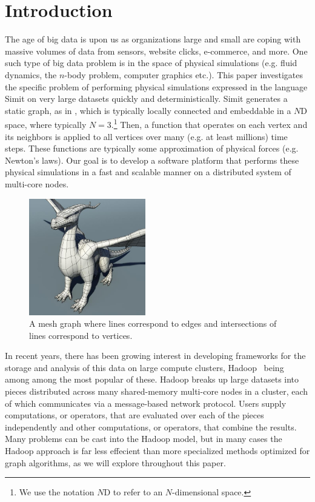 \section{Introduction}
\label{sec:intro}



The age of {\large big data} is upon us as organizations large and small 
are coping with massive volumes of data from sensors, website 
clicks, e-commerce, and more. One such type of big data
problem is in the space of physical simulations (e.g. fluid dynamics,
the $n$-body problem, computer graphics etc.).  This paper investigates 
the specific problem of performing physical simulations
expressed in the language Simit on very large datasets quickly and
deterministically.  Simit generates a static graph, as in , 
which is typically
locally connected and embeddable in a $N$D space, where typically
$N=3$.\footnote{We use the notation $N$D to refer to an $N$-dimensional
space.}  Then, a function that operates on each vertex and its neighbors 
is applied to all vertices over many (e.g. at least millions) time steps.
These functions are typically some approximation of physical forces (e.g.
Newton's laws).  Our goal is to develop a software platform that performs these
physical simulations in a fast and scalable manner on a distributed system of 
multi-core nodes.

\begin{figure}
\centering
\includegraphics[width=2in]{figures/dragon}
\caption{A mesh graph where lines correspond to edges and intersections of lines correspond to vertices.}
\label{fig:mesh}
\end{figure}



In recent years, there has been 
growing interest in developing frameworks for the storage and 
analysis of this data on large compute clusters, 
Hadoop~\cite{CuttingCa05,DeanGh08} being among among the most 
popular of these. Hadoop breaks up 
large datasets into pieces distributed across many shared-memory
multi-core nodes in a cluster, each of which communicates via
a message-based network protocol. Users supply computations, 
or  operators, that are evaluated over each of 
the pieces independently and other computations, or  
operators, that combine the results. 
Many problems can be cast into the Hadoop model, but in many 
cases the Hadoop approach is far less effecient than more 
specialized methods optimized for graph algorithms, 
as we will explore throughout this paper.


